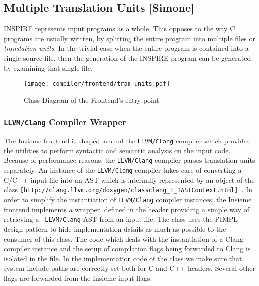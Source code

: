\subsection{Multiple Translation Units [Simone]}
\label{sec:Insieme.Frontend.TranslationUnits}

INSPIRE represents input programs as a whole. This opposes to the way C programs
are usually written, by splitting the entire program into multiple files or
\emph{translation units}. In the trivial case when the entire program is
contained into a single source file, then the generation of the INSPIRE program
can be generated by examining that single file.

\begin{figure}[tb]
	\centering
	\texttt{[image: compiler/frontend/tran\_units.pdf]}
	\caption{Class Diagram of the Frontend's entry point}
	\label{fig:Frontend.Translation.Units}
\end{figure}

\subsubsection{{\tt LLVM/Clang} Compiler Wrapper}

The Insieme frontend is shaped around the {\tt LLVM/Clang} compiler which
provides the utilities to perform syntactic and semantic analysis on the input
code. Because of performance reasons, the {\tt LLVM/Clang} compiler parses
translation units separately.  An instance of the {\tt LLVM/Clang} compiler
takes care of converting a C/C++ input file into an AST which is internally
represented by an object of the class  
{\tt [\url{http://clang.llvm.org/doxygen/classclang_1_1ASTContext.html}] }. 
In order to simplify the instantiation of {\tt LLVM/Clang} compiler instances,
the Insieme frontend implements a wrapper,  defined in the
 header providing a simple way of retrieving a {\tt
LLVM/Clang} AST from an input file. The class uses the PIMPL design pattern to
hide implementation details as much as possible to the consumer of this class.
The code which deals with the instantiation of a Clang compiler instance and the
setup of compilation flags being forwarded to Clang is isolated in the
 file. In the implementation code of the
 class we make sure that system include paths are correctly
set both for C and C++ headers. Several other flags are forwarded from the
Insieme input flags. 

